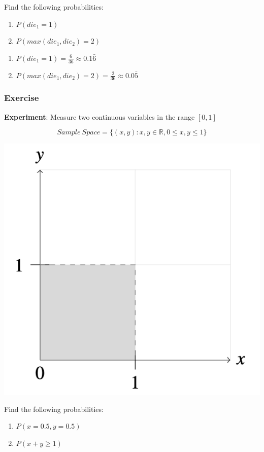 \documentclass[
  letterpaper,
  DIV=11,
  numbers=noendperiod]{scrreprt}
\providecommand{\tightlist}{%
  \setlength{\itemsep}{0pt}\setlength{\parskip}{0pt}}\usepackage{longtable,booktabs,array}
\begin{document}
Find the following probabilities:

\begin{enumerate}
\def\labelenumi{\arabic{enumi}.}
\tightlist
\item
  \(P(die_1 = 1)\)
\item
  \(P(max(die_1, die_2) = 2)\)
\end{enumerate}

\begin{tcolorbox}[enhanced jigsaw, toprule=.15mm, leftrule=.75mm, coltitle=black, left=2mm, opacityback=0, titlerule=0mm, arc=.35mm, toptitle=1mm, opacitybacktitle=0.6, bottomtitle=1mm, colframe=quarto-callout-tip-color-frame, title=\textcolor{quarto-callout-tip-color}{\faLightbulb}\hspace{0.5em}{Solution}, rightrule=.15mm, bottomrule=.15mm, colbacktitle=quarto-callout-tip-color!10!white, breakable, colback=white]

\begin{enumerate}
\def\labelenumi{\arabic{enumi}.}
\tightlist
\item
  \(P(die_1 = 1) = \frac{6}{36} \approx 0.1\bar{6}\)
\item
  \(P(max(die_1, die_2) = 2) = \frac{2}{36} \approx 0.0\bar{5}\)
\end{enumerate}

\end{tcolorbox}

\subsubsection{Exercise}\label{exercise-5}

\textbf{Experiment}: Measure two continuous variables in the range
\([0,1]\)

\[ 
Sample\ Space = \{ (x, y) : x,y \in \mathbb{R}, 0 \leq x, y \leq 1  \} 
\]

\includegraphics[width=0.3\linewidth,height=\textheight,keepaspectratio]{lecture2/images/continuous-axiomatic.png}

Find the following probabilities:

\begin{enumerate}
\def\labelenumi{\arabic{enumi}.}
\tightlist
\item
  \(P(x = 0.5 , y = 0.5)\)
\item
  \(P(x+y \geq 1)\)
\end{enumerate}
\end{document}
